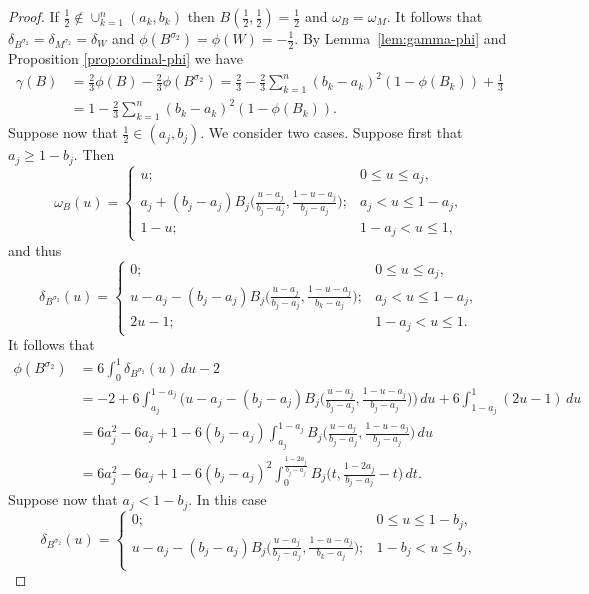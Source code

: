 \documentclass[12pt,a4paper]{amsart}
\theoremstyle{definition}
\begin{document}
\begin{proof}
If $\tfrac12 \notin \cup_{k=1}^n(a_k, b_k)$ then $B(\tfrac12,\tfrac12)=\tfrac12$ and 
$\omega_B = \omega_M$. It follows that $\delta_{B^{\sigma_2}} = \delta_{M^{\sigma_2}} = \delta_{W}$ and $\phi(B^{\sigma_2}) = \phi(W) = -\tfrac12$.
By Lemma~\ref{lem:gamma-phi} and Proposition \ref{prop:ordinal-phi} we have
\begin{align*}
   \gamma(B) &= \tfrac23 \phi(B) - \tfrac23 \phi(B^{\sigma_2}) = \tfrac23 - \tfrac23\sum_{k=1}^n (b_k-a_k)^2(1-\phi(B_k)) + \tfrac13 \\
   &= 1 - \tfrac23\sum_{k=1}^n (b_k-a_k)^2(1-\phi(B_k)). 
\end{align*}
Suppose now that $\tfrac12 \in (a_j,b_j)$. We consider two cases. Suppose first that $a_j\ge 1-b_j$.
Then
$$\omega_B(u) = \begin{cases} u; & 0 \le u \le a_j,\\
		a_j + (b_j-a_j)B_j\big(\frac{u-a_j}{b_j-a_j}, \frac{1-u-a_j}{b_j-a_j}\big); & a_j < u \le 1-a_j,\\
		1-u; &  1-a_j < u \le 1,
    \end{cases}$$
and thus
$$\delta_{B^{\sigma_2}}(u) = \begin{cases} 0; & 0 \le u \le a_j,\\
		u - a_j - (b_j-a_j)B_j\big(\frac{u-a_j}{b_j-a_j}, \frac{1-u-a_j}{b_k-a_j}\big); & a_j < u \le 1-a_j,\\
		2u-1; &  1-a_j < u \le 1.
    \end{cases}$$
It follows that 
\begin{align*}
\phi(B^{\sigma_2}) &= 6 \int_0^1 \delta_{B^{\sigma_2}}(u) \, du -2 \\
&= -2 + 6\int_{a_j}^{1-a_j} \big(u - a_j - (b_j-a_j)B_j\big(\tfrac{u-a_j}{b_j-a_j}, \tfrac{1-u-a_j}{b_j-a_j}\big)\big) \, du + 6\int_{1-a_j}^1 (2u-1) \, du \\
&= 6a_j^2-6a_j+1 - 6(b_j-a_j)\int_{a_j}^{1-a_j} B_j\big(\tfrac{u-a_j}{b_j-a_j}, \tfrac{1-u-a_j}{b_j-a_j}\big) \, du \\
&= 6a_j^2-6a_j+1 - 6(b_j-a_j)^2\int_{0}^{\frac{1-2a_j}{b_j-a_j}} B_j\big(t, \tfrac{1-2a_j}{b_j-a_j}-t\big) \, dt. 
\end{align*}
Suppose now that $a_j < 1-b_j$. In this case 
$$\delta_{B^{\sigma_2}}(u) = \begin{cases} 0; & 0 \le u \le 1-b_j,\\
		u - a_j - (b_j-a_j)B_j\big(\frac{u-a_j}{b_j-a_j}, \frac{1-u-a_j}{b_k-a_j}\big); & 1-b_j < u \le b_j,\\

\end{cases}$$
\end{proof}
\end{document}
